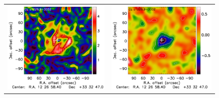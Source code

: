 \documentclass[twocolumn,traditabstract]{aa}
\begin{document}
\begin{figure}[h]
{\begin{tabular}{ll}
\includegraphics[trim=0cm 2.2cm 0cm 0cm, clip=true, scale=1]{Figure/Grad_CLJ1227_15_15_45_noannot.pdf} & 
\includegraphics[trim=2.3cm 2.2cm 0cm 0cm, clip=true, scale=1]{Figure/DoG_CLJ1227_15_15_45_noannot.pdf} \\

\end{tabular}}
\end{figure}
\end{document}
